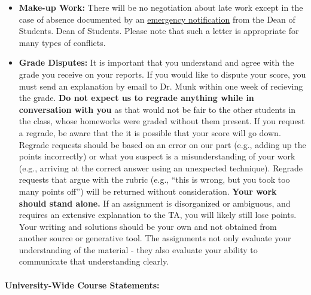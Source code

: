\documentclass[11pt, a4paper]{article}
\begin{document}
\begin{itemize}
\item[] \textbf{Make-up Work:} There will be no negotiation about late work
        except in the case of absence documented by an 
\href{https://studentlife.oregonstate.edu/emergency-notifications}{emergency notification} from the Dean of Students.
        Dean of Students. Please note that such a letter is appropriate for many
        types of conflicts. 

\item[] \textbf{Grade Disputes:} It is important that you understand and agree
        with the grade you receive on your reports. If you would like
        to dispute your score, you must send an explanation by email to Dr.
        Munk within one week of recieving the grade.
        \textbf{Do not expect us to regrade anything while in conversation with
        you} as that would not be fair to the other students in the class, whose
        homeworks were graded without them present.  If you request a regrade,
        be aware that the it is possible that your score will go down.
        Regrade requests should be based on an error on our part (e.g., adding
        up the points incorrectly) or what you suspect is a misunderstanding of
        your work (e.g., arriving at the correct answer using an unexpected
        technique). Regrade requests that argue with the rubric (e.g., ``this is
        wrong, but you took too many points off'') will be returned without
        consideration.
        \textbf{Your work should stand alone.} If an assignment is disorganized or
        ambiguous, and requires an extensive explanation to the TA, you
        will likely still lose points. 
        Your writing and solutions should be your own and not obtained from another
        source or generative tool. 
        The assignments not only evaluate your
        understanding of the material - they also evaluate your ability to
        communicate that understanding clearly.
\end{itemize}

\paragraph{University-Wide Course Statements:}
\end{document}
